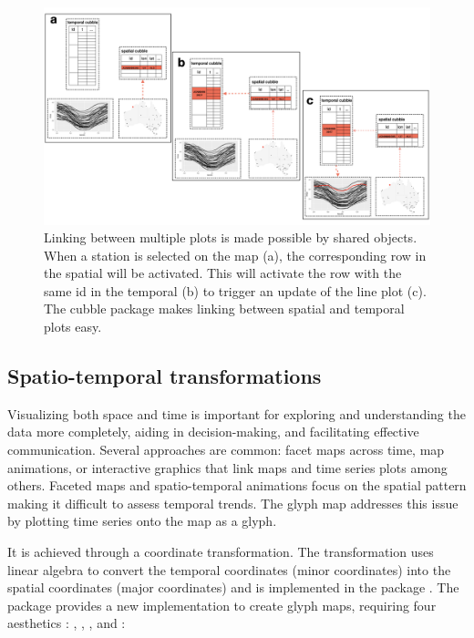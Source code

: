 \documentclass[
  shortnames]{jss}
\begin{document}
\begin{CodeChunk}
\begin{figure}

{\centering \includegraphics[width=1\linewidth,height=0.35\textheight]{figures/diagram-keynotes/‎diagram-keynotes.‎002} 

}

\caption{Linking between multiple plots is made possible by shared  objects. When a station is selected on the map (a), the corresponding row in the spatial  will be activated. This will activate the row with the same id in the temporal  (b) to trigger an update of the line plot (c). The cubble package makes linking between spatial and temporal plots easy.}\label{fig:illu-interactive}
\end{figure}
\end{CodeChunk}

\hypertarget{st_transformation}{%
\subsection{Spatio-temporal transformations}\label{st_transformation}}

Visualizing both space and time is important for exploring and understanding the data more completely, aiding in decision-making, and facilitating effective communication. Several approaches are common: facet maps across time, map animations, or interactive graphics that link maps and time series plots among others. Faceted maps and spatio-temporal animations focus on the spatial pattern making it difficult to assess temporal trends. The glyph map \citep{Wickham2012-yr} addresses this issue by plotting time series onto the map as a glyph.

It is achieved through a coordinate transformation. The transformation uses linear algebra to convert the temporal coordinates (minor coordinates) into the spatial coordinates (major coordinates) and is implemented in the package  \citep{ggally}. The  package provides a new  implementation to create glyph maps,  requiring four aesthetics : , , , and :
\end{document}
